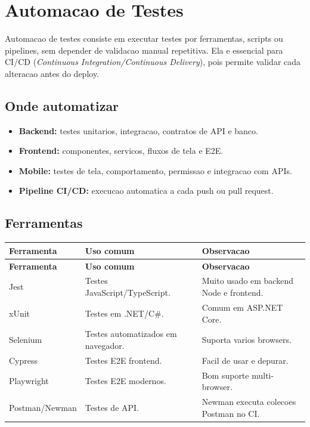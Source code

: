 \documentclass[12pt,a4paper]{article}
\begin{document}
\section{Automacao de Testes}

Automacao de testes consiste em executar testes por ferramentas, scripts ou pipelines, sem depender de validacao manual repetitiva. Ela e essencial para CI/CD (\textit{Continuous Integration/Continuous Delivery}), pois permite validar cada alteracao antes do deploy.

\subsection{Onde automatizar}

\begin{itemize}
  \item \textbf{Backend:} testes unitarios, integracao, contratos de API e banco.
  \item \textbf{Frontend:} componentes, servicos, fluxos de tela e E2E.
  \item \textbf{Mobile:} testes de tela, comportamento, permissao e integracao com APIs.
  \item \textbf{Pipeline CI/CD:} execucao automatica a cada push ou pull request.
\end{itemize}

\subsection{Ferramentas}

\begin{longtable}{@{}L{3.2cm}L{4.5cm}L{6.2cm}@{}}
\toprule
\textbf{Ferramenta} & \textbf{Uso comum} & \textbf{Observacao} \\
\midrule
\endfirsthead
\toprule
\textbf{Ferramenta} & \textbf{Uso comum} & \textbf{Observacao} \\
\midrule
\endhead
Jest & Testes JavaScript/TypeScript. & Muito usado em backend Node e frontend. \\
xUnit & Testes em .NET/C\#. & Comum em ASP.NET Core. \\
Selenium & Testes automatizados em navegador. & Suporta varios browsers. \\
Cypress & Testes E2E frontend. & Facil de usar e depurar. \\
Playwright & Testes E2E modernos. & Bom suporte multi-browser. \\
Postman/Newman & Testes de API. & Newman executa colecoes Postman no CI. \\
\bottomrule
\end{longtable}
\end{document}
